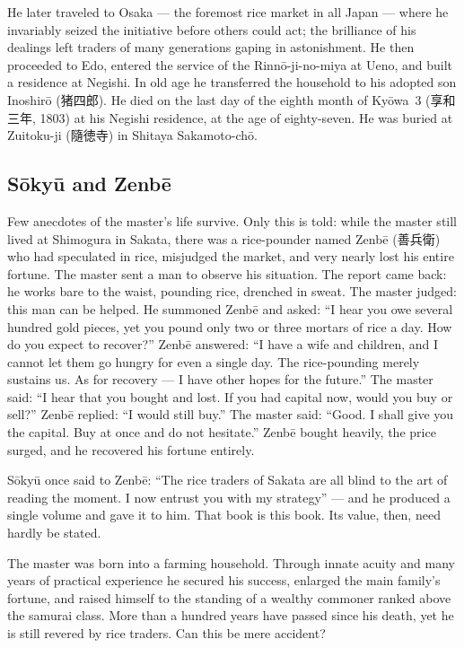 \documentclass[10pt, openany]{book}
\newcommand{\jp}[1]{{\japanesefont #1}}
\begin{document}
He later traveled to Osaka --- the foremost rice market in all Japan ---
where he invariably seized the initiative before others could act; the
brilliance of his dealings left traders of many generations gaping in
astonishment. He then proceeded to Edo, entered the service of the
Rinn\=o-ji-no-miya at Ueno, and built a residence at Negishi. In old
age he transferred the household to his adopted son Inoshir\=o
(\jp{猪四郎}). He died on the last day of the eighth month of Ky\=owa~3
(\jp{享和三年}, 1803) at his Negishi residence, at the age of
eighty-seven. He was buried at Zuitoku-ji (\jp{隨徳寺}) in Shitaya
Sakamoto-ch\=o.

\subsection*{S\=oky\=u and Zenb\=e}

Few anecdotes of the master's life survive. Only this is told: while the
master still lived at Shimogura in Sakata, there was a rice-pounder
named Zenb\=e (\jp{善兵衛}) who had speculated in rice, misjudged the
market, and very nearly lost his entire fortune. The master sent a man to
observe his situation. The report came back: he works bare to the waist,
pounding rice, drenched in sweat. The master judged: this man can be
helped. He summoned Zenb\=e and asked: ``I hear you owe several hundred
gold pieces, yet you pound only two or three mortars of rice a day. How
do you expect to recover?'' Zenb\=e answered: ``I have a wife and
children, and I cannot let them go hungry for even a single day. The
rice-pounding merely sustains us. As for recovery --- I have other hopes
for the future.'' The master said: ``I hear that you bought and lost. If
you had capital now, would you buy or sell?'' Zenb\=e replied: ``I would
still buy.'' The master said: ``Good. I shall give you the capital. Buy
at once and do not hesitate.'' Zenb\=e bought heavily, the price surged,
and he recovered his fortune entirely.

S\=oky\=u once said to Zenb\=e: ``The rice traders of Sakata are all
blind to the art of reading the moment. I now entrust you with my
strategy'' --- and he produced a single volume and gave it to him. That
book is this book. Its value, then, need hardly be stated.

The master was born into a farming household. Through innate acuity and
many years of practical experience he secured his success, enlarged the
main family's fortune, and raised himself to the standing of a wealthy
commoner ranked above the samurai class. More than a hundred years have
passed since his death, yet he is still revered by rice traders. Can
this be mere accident?
\end{document}
